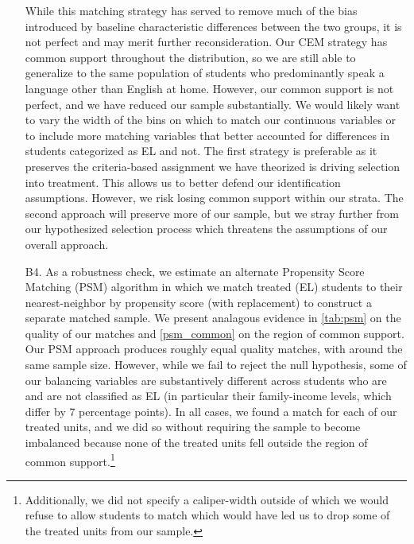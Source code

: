 \documentclass[a4paper, 11pt]{article}
\begin{document}
\begin{enumerate}
	While this matching strategy has served to remove much of the bias introduced by baseline characteristic differences between the two groups, it is not perfect and may merit further reconsideration. Our CEM strategy has common support throughout the distribution, so we are still able to generalize to the same population of students who predominantly speak a language other than English at home. However, our common support is not perfect, and we have reduced our sample substantially. We would likely want to vary the width of the bins on which to match our continuous variables or to include more matching variables that better accounted for differences in students categorized as EL and not. The first strategy is preferable as it preserves the criteria-based assignment we have theorized is driving selection into treatment. This allows us to better defend our identification assumptions. However, we risk losing common support within our strata. The second approach will preserve more of our sample, but we stray further from our hypothesized selection process which threatens the assumptions of our overall approach.

	\item[B4.] As a robustness check, we estimate an alternate Propensity Score Matching (PSM) algorithm in which we match treated (EL) students to their nearest-neighbor by propensity score (with replacement) to construct a separate matched sample. We present analagous evidence in \autoref{tab:psm} on the quality of our matches and \autoref{psm_common} on the region of common support. Our PSM approach produces roughly equal quality matches, with around the same sample size. However, while we fail to reject the null hypothesis, some of our balancing variables are substantively different across students who are and are not classified as EL (in particular their family-income levels, which differ by 7 percentage points). In all cases, we found a match for each of our treated units, and we did so without requiring the sample to become imbalanced because none of the treated units fell outside the region of common support.\footnote{Additionally, we did not specify a caliper-width outside of which we would refuse to allow students to match which would have led us to drop some of the treated units from our sample.}


\end{enumerate}
\end{document}
